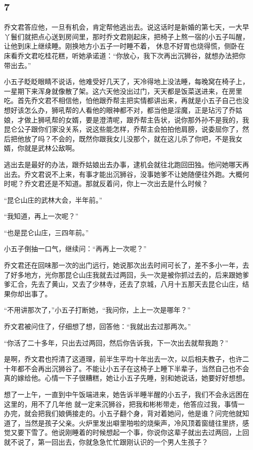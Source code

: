 {\centering\subsection{7}}

乔文君答应他，一旦有机会，肯定帮他逃出去。说这话时是新婚的第七天，一大早丫鬟们就把点心送到房间里，那时乔文君刚起床，把椅子上熬一宿的小五子叫醒，让他到床上继续睡。刚换地方小五子一时睡不着，
休息不好胃也烧得慌，侧卧在床看乔文君吃桂花糕，听她承诺道：“你放心，我下次再出沉狮谷，就想办法把你带出去。”

小五子眨眨眼睛不说话，他难受好几天了，天冷得地上没法睡，每晚窝在椅子上，一星期下来浑身就像散了架。这六天他没出过门，天天都是饭菜送进来，在房里吃。首先乔文君不相信他，怕他跟乔帮主把实情都讲出来，再就是小五子自己也没想好该怎么办，狮吼帮的人看他的眼神都不对，都当他是淫魔，正是玷污了乔姑娘，才做上狮吼帮的女婿，要是澄清呢，跟乔帮主告状，说你那外孙不是我的，我昆仑公子跟你们家没关系，说这些能怎样，乔帮主会拍拍他肩膀，说委屈你了，然后把他放了吗？不会的，既然你跟我女儿没那个，就在这儿杀了你吧，不是我女婿，你就是武林公敌啊。

逃出去是最好的办法，跟乔姑娘出去办事，逮机会就往北跑回田独。他问她哪天再出去。乔文君说不上来，有事才能出沉狮谷，没事她爹不让她随便往外跑。大概何时呢？乔文君还是不知道。那就反着问，你上一次出去是什么时候？

“昆仑山庄的武林大会，半年前。”

“我知道，再上一次呢？”

“也是昆仑山庄，三四年前。”

小五子倒抽一口气，继续问：“再再上一次呢？”

乔文君还在回味那一次的出门远行，她说那次出去时间可长了，差不多小一年，去了好多地方，光你那昆仑山庄我就去过两回，头一次是被你抓过去的，后来跟她爹爹汇合，先去了黄山，又去了少林寺，还去了京城，八月十五那天去昆仑山庄，结果你却出事了。

“不用讲那次了，”小五子打断她，“我问你，上上一次是哪年？”

乔文君被问住了，仔细想了想，回答他：“我就出去过那两次。”

“你活了二十多年，只出去过两回，然后你告诉我，下一次出去就帮我跑？”

是啊，乔文君也捋清了这道理，前半生平均十年出去一次，以后相夫教子，也许二十年都不会再出沉狮谷了。不能让小五子在这椅子上睡下半辈子，当然自己也不会真的嫁给他。心情一下子很糟糕，她让小五子先睡，别和她说话，她要好好想想。

想了一上午，一直到中午饭端进来，她告诉半睡半醒的小五子，我们不会永远困在这里的，用不了几年他
就一定来沉狮谷，把我和彬彬带走，他答应过我，事情一办完，就会把我们娘俩接走的。小五子翻个身，背对着她问，他是谁？问完他就知道了，当然是孩子父亲。火炉里发出噼里啪啦的烧柴声，冷风顶着窗缝往里挤，感觉又要下雪了。他说刚睡着的时候想起一个事，你说你这辈子就出去过两回，上回就不说了，第一回出去，你就急急忙忙跟刚认识的一个男人生孩子？

